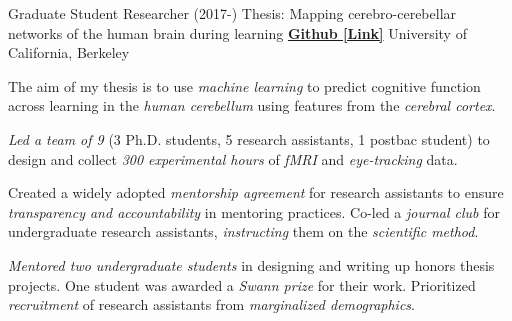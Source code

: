 

\begin{cventries}

  \cventry
    {Graduate Student Researcher (2017-)} %
    {Thesis: Mapping cerebro-cerebellar networks of the human brain during learning}
    {\href{https://github.com/maedbhk/cerebellum_learning_connect}{\textbf{Github [Link]}}}
    {University of California, Berkeley} %
    {
      \begin{cvitems} %
        \item {The aim of my thesis is to use \textit{machine learning} to predict cognitive function across learning in the \textit{human cerebellum} using features from the \textit{cerebral cortex}.} 
        \item {\textit{Led a team of 9} (3 Ph.D. students, 5 research assistants, 1 postbac student) to design and collect \textit{300 experimental hours} of \textit{fMRI} and \textit{eye-tracking} data.}
        \item {Created a widely adopted \textit{mentorship agreement} for research assistants to ensure \textit{transparency and accountability} in mentoring practices. Co-led a \textit{journal club} for undergraduate research assistants, \textit{instructing} them on the \textit{scientific method}.}
        \item {\textit{Mentored two undergraduate students} in designing and writing up honors thesis projects. One student was awarded a \textit{Swann prize} for their work. Prioritized \textit{recruitment} of research assistants from \textit{marginalized demographics}.}
      \end{cvitems}
    }
    

\end{cventries}
